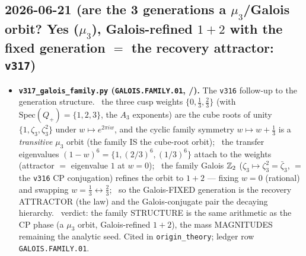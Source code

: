 \subsection*{2026-06-21 (are the 3 generations a $\mu_3$/Galois orbit? Yes ($\mu_3$), Galois-refined $1{+}2$ with the fixed generation $=$ the recovery attractor: \texttt{v317})}
\begin{itemize}
\item \textbf{\texttt{v317\_galois\_family.py} (\texttt{GALOIS.FAMILY.01}, \mE/\mC).} The \texttt{v316} follow-up to the
  generation structure. \mE\ the three cusp weights $\{0,\tfrac13,\tfrac23\}$ (with $\mathrm{Spec}(Q_+)=\{1,2,3\}$,
  the $A_3$ exponents) are the cube roots of unity $\{1,\zeta_3,\zeta_3^2\}$ under $w\mapsto e^{2\pi i w}$, and the
  cyclic family symmetry $w\mapsto w{+}\tfrac13$ is a \emph{transitive} $\mu_3$ orbit (the family IS the cube-root
  orbit); \mE\ the transfer eigenvalues $(1{-}w)^6=\{1,(2/3)^6,(1/3)^6\}$ attach to the weights (attractor $=$
  eigenvalue $1$ at $w{=}0$); \mE\ the family Galois $\mathbb{Z}_2$ ($\zeta_3\mapsto\zeta_3^2=\bar\zeta_3$, $=$ the
  \texttt{v316} CP conjugation) refines the orbit to $1{+}2$ --- fixing $w{=}0$ (rational) and swapping
  $w{=}\tfrac13\leftrightarrow\tfrac23$; \mE\ so the Galois-FIXED generation is the recovery ATTRACTOR (the law) and
  the Galois-conjugate pair the decaying hierarchy. \mC\ verdict: the family STRUCTURE is the same arithmetic as the
  CP phase (a $\mu_3$ orbit, Galois-refined $1{+}2$), the mass MAGNITUDES remaining the analytic seed. Cited in
  \texttt{origin\_theory}; ledger row \texttt{GALOIS.FAMILY.01}.
\end{itemize}

